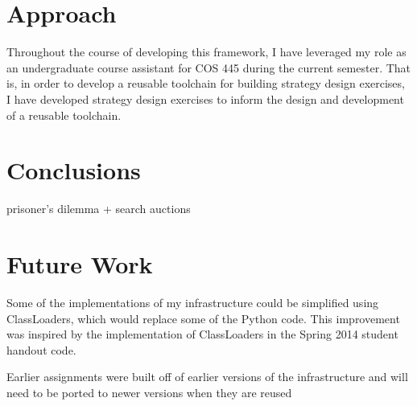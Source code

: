 \documentclass[pageno]{jpaper}
\begin{document}
\section*{Approach}
Throughout the course of developing this framework, I have leveraged my role as an undergraduate course assistant for COS 445 during the current semester.
That is, in order to develop a reusable toolchain for building strategy design exercises, I have developed strategy design exercises to inform the design and development of a reusable toolchain.


\section*{Conclusions}
prisoner's dilemma + search auctions

\section*{Future Work}

Some of the implementations of my infrastructure could be simplified using ClassLoaders, which would replace some of the Python code.
This improvement was inspired by the implementation of ClassLoaders in the Spring 2014 student handout code.

Earlier assignments were built off of earlier versions of the infrastructure and will need to be ported to newer versions when they are reused
\end{document}
